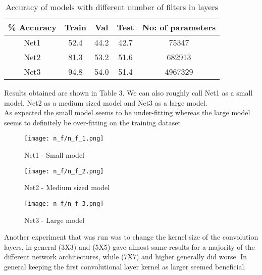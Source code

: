 \documentclass{article}
\begin{document}
\begin{table}[h!]
\begin{center}
 \begin{tabular}{||c | c c c| c||} 
 
 \hline
\% Accuracy  &  Train &  Val & Test & No: of parameters\\ [0.5ex] 
 \hline\hline
 Net1 & 52.4 & 44.2 & 42.7 & 75347\\
 \hline
 Net2 & 81.3 & 53.2 & 51.6 & 682913\\
 \hline
 Net3 & 94.8 & 54.0 & 51.4 & 4967329\\
 \hline
 
\end{tabular}
\end{center}
\label{table:n_f_table}
\vspace{-1.0em}
\caption{Accuracy of models with different number of filters in layers} 
\end{table}

\noindent
Results obtained are shown in Table 3. We can also roughly call Net1 as a small model, Net2 as a medium sized model and Net3 as a large model.
\\

\noindent
As expected the small model seems to be under-fitting whereas the large model seems to definitely be over-fitting on the training dataset


\begin{figure}[H]
    \centering
    \texttt{[image: n\_f/n\_f\_1.png]}
    \caption{Net1 - Small model}
    \label{fig:net1}
\end{figure}

\begin{figure} [H]
    \centering
    \texttt{[image: n\_f/n\_f\_2.png]}
    \caption{Net2 - Medium sized model}
    \label{fig:net2}
\end{figure}

\begin{figure} [H]
    \centering
    \texttt{[image: n\_f/n\_f\_3.png]}
    \caption{Net3 - Large model}
    \label{fig:net3}
\end{figure}

\noindent
Another experiment that was run was to change the kernel size of the convolution layers, in general (3X3) and (5X5) gave almost same results for a majority of the different network architectures, while (7X7) and higher generally did worse. In general keeping the first convolutional layer kernel as larger seemed beneficial. 
\\
\\
\end{document}
